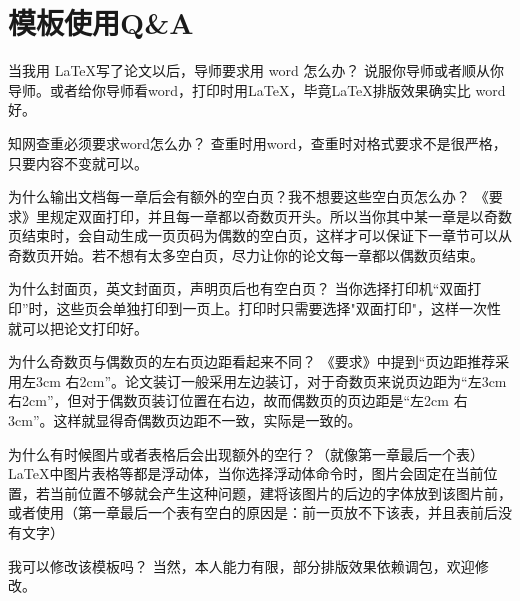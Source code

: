 \linespread{1.55}\selectfont
\chapter{模板使用Q\&A}
\begin{mybox}{当我用 \LaTeX 写了论文以后，导师要求用 word 怎么办？}
说服你导师或者顺从你导师。或者给你导师看word，打印时用\LaTeX，毕竟\LaTeX 排版效果确实比 word 好。
\end{mybox}
\begin{mybox}{知网查重必须要求word怎么办？}
查重时用word，查重时对格式要求不是很严格，只要内容不变就可以。
\end{mybox}

\begin{mybox}{为什么输出文档每一章后会有额外的空白页？我不想要这些空白页怎么办？}
《要求》里规定双面打印，并且{\color{red}每一章都以奇数页开头}。所以当你其中某一章是以奇数页结束时，会自动生成一页页码为偶数的空白页，这样才可以保证下一章节可以从奇数页开始。若不想有太多空白页，尽力让你的论文每一章都以偶数页结束。
\end{mybox}

\begin{mybox}{为什么封面页，英文封面页，声明页后也有空白页？}
当你选择打印机“双面打印”时，这些页会单独打印到一页上。打印时只需要选择"双面打印"，这样一次性就可以把论文打印好。
\end{mybox}

\begin{mybox}{为什么奇数页与偶数页的左右页边距看起来不同？}
《要求》中提到“页边距推荐采用左3cm 右2cm”。论文装订一般采用左边装订，对于奇数页来说页边距为“左3cm 右2cm”，但对于偶数页装订位置在右边，故而偶数页的页边距是“左2cm 右3cm”。这样就显得奇偶数页边距不一致，实际是一致的。
\end{mybox}

\begin{mybox}{为什么有时候图片或者表格后会出现额外的空行？（就像第一章最后一个表）}
\LaTeX 中图片表格等都是浮动体，当你选择浮动体\myverb{[H]}命令时，图片会固定在当前位置，若当前位置不够就会产生这种问题，建将该图片的后边的字体放到该图片前，或者使用（第一章最后一个表有空白的原因是：前一页放不下该表，并且表前后没有文字）
\end{mybox}

\begin{mybox}{我可以修改该模板吗？}
当然，本人能力有限，部分排版效果依赖调包，欢迎修改。
\end{mybox}